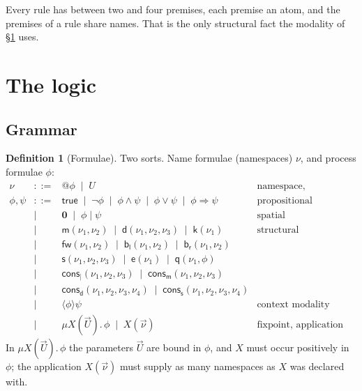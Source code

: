 \documentclass[11pt]{article}
\makeatletter
\theoremstyle{plain}
\theoremstyle{definition}
\newtheorem{definition}[theorem]{Definition}
\theoremstyle{remark}
\newcommand{\quo}[1]{@#1}
\newcommand{\nil}{\mathbf{0}}
\newcommand{\mm}{\mathsf{m}}
\newcommand{\dd}{\mathsf{d}}
\newcommand{\kk}{\mathsf{k}}
\newcommand{\fw}{\mathsf{fw}}
\newcommand{\bl}{\mathsf{b}_{\mathsf{l}}}
\newcommand{\br}{\mathsf{b}_{\mathsf{r}}}
\newcommand{\sy}{\mathsf{s}}
\newcommand{\ev}{\mathsf{e}}
\newcommand{\qq}{\mathsf{q}}
\newcommand{\cons}{\mathsf{cons}}
\newcommand{\consp}{\cons_{\mid}}
\newcommand{\consm}{\cons_{\mm}}
\newcommand{\consd}{\cons_{\dd}}
\newcommand{\conss}{\cons_{\sy}}
\newcommand{\may}[1]{\langle #1 \rangle}
\newcommand{\fix}{\mu}
\makeatother
\begin{document}
Every rule has between two and four premises, each premise an atom, and the
premises of a rule share names. That is the only structural fact the modality of
\S\ref{sec:logic} uses.

\section{The logic}
\label{sec:logic}

\subsection{Grammar}

\begin{definition}[Formulae]
\label{def:grammar}
Two sorts. Name formulae (namespaces) $\nu$, and process formulae $\phi$:
\[
\begin{array}{rcll}
  \nu &::=& \quo{\phi} \;\mid\; U & \text{namespace, namespace parameter}\\[4pt]
  \phi,\psi &::=& \mathsf{true} \;\mid\; \neg\phi \;\mid\; \phi \wedge \psi
        \;\mid\; \phi \vee \psi \;\mid\; \phi \Rightarrow \psi
        & \text{propositional}\\
     &\mid& \nil \;\mid\; \phi \mid \psi & \text{spatial}\\
     &\mid& \mm(\nu_1,\nu_2) \;\mid\; \dd(\nu_1,\nu_2,\nu_3)
            \;\mid\; \kk(\nu_1) & \text{structural}\\
     &\mid& \fw(\nu_1,\nu_2) \;\mid\; \bl(\nu_1,\nu_2)
            \;\mid\; \br(\nu_1,\nu_2)&\\
     &\mid& \sy(\nu_1,\nu_2,\nu_3) \;\mid\; \ev(\nu_1)
            \;\mid\; \qq(\nu_1,\phi)&\\
     &\mid& \consp(\nu_1,\nu_2,\nu_3) \;\mid\; \consm(\nu_1,\nu_2,\nu_3)&\\
     &\mid& \consd(\nu_1,\nu_2,\nu_3,\nu_4)
            \;\mid\; \conss(\nu_1,\nu_2,\nu_3,\nu_4)&\\
     &\mid& \may{\phi}\psi & \text{context modality}\\
     &\mid& \fix X(\vec U).\,\phi \;\mid\; X(\vec\nu)
            & \text{fixpoint, application}
\end{array}
\]
In $\fix X(\vec U).\,\phi$ the parameters $\vec U$ are bound in $\phi$, and $X$
must occur positively in $\phi$; the application $X(\vec\nu)$ must supply as
many namespaces as $X$ was declared with.
\end{definition}
\end{document}
